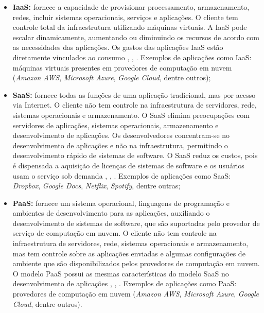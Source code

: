 \begin{itemize}
    \item \textbf{\acrfull{IaaS}:} fornece a capacidade de provisionar processamento, armazenamento, redes, incluir sistemas operacionais, serviços e aplicações. O cliente tem controle total da infraestrutura utilizando máquinas virtuais. A \acrshort{IaaS} pode escalar dinamicamente, aumentando ou diminuindo os recursos de acordo com as necessidades das aplicações. Os gastos das aplicações \acrshort{IaaS} estão diretamente vinculados ao consumo \cite{Zhang2010}, \cite{Jadeja2012}, \cite{Puthal2015}. Exemplos de aplicações como \acrshort{IaaS}: máquinas virtuais presentes em provedores de computação em nuvem (\textit{Amazon AWS}, \textit{Microsoft Azure}, \textit{Google Cloud}, dentre outros);
    \item \textbf{\acrfull{SaaS}:} fornece todas as funções de uma aplicação tradicional, mas por acesso via Internet. O cliente não tem controle na infraestrutura de servidores, rede, sistemas operacionais e armazenamento. O \acrshort{SaaS} elimina preocupações com servidores de aplicações, sistemas operacionais, armazenamento e desenvolvimento de aplicações. Os desenvolvedores concentram-se no desenvolvimento de aplicações e não na infraestrutura, permitindo o desenvolvimento rápido de sistemas de software. O \acrshort{SaaS} reduz os custos, pois é dispensada a aquisição de licenças de sistemas de software e os usuários usam o serviço sob demanda \cite{Zhang2010}, \cite{Jadeja2012}, \cite{Puthal2015}. Exemplos de aplicações como \acrshort{SaaS}: \textit{Dropbox}, \textit{Google Docs}, \textit{Netflix}, \textit{Spotify}, dentre outras;
    \item \textbf{\acrfull{PaaS}:} fornece um sistema operacional, linguagens de programação e ambientes de desenvolvimento para as aplicações, auxiliando o desenvolvimento de sistemas de software, que são suportadas pelo provedor de serviço de computação em nuvem. O cliente não tem controle na infraestrutura de servidores, rede, sistemas operacionais e armazenamento, mas tem controle sobre as aplicações enviadas e algumas configurações de ambiente que são disponibilizados pelos provedores de computação em nuvem. O modelo \acrshort{PaaS} possui as mesmas características do modelo \acrshort{SaaS} no desenvolvimento de aplicações \cite{Zhang2010}, \cite{Jadeja2012}, \cite{Puthal2015}. Exemplos de aplicações como \acrshort{PaaS}: provedores de computação em nuvem (\textit{Amazon AWS}, \textit{Microsoft Azure}, \textit{Google Cloud}, dentre outros).
\end{itemize}

